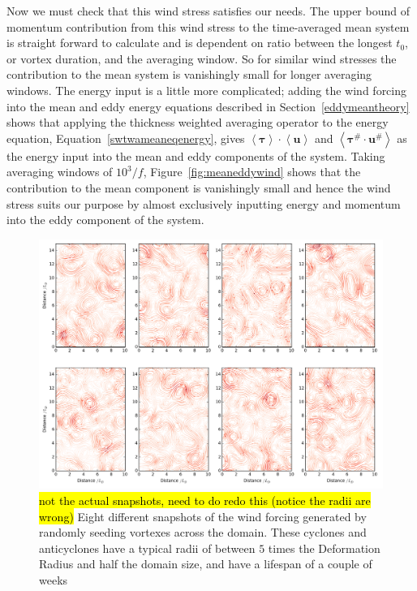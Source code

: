 \documentclass[12pt,a4paper]{report}
\newcommand*\nthkmean[1]{\left\langle{#1}\right\rangle}
\newcommand*\nthkres[1]{{#1}^{\#}}
\newcommand*\figref[1]{Figure~\ref{#1}}
\newcommand*\equref[1]{Equation~\eqref{#1}}
\newcommand*\secref[1]{Section~\ref{#1}}
\begin{document}
Now we must check that this wind stress satisfies our needs. 
The upper bound of momentum contribution from
this wind stress to the time-averaged mean system is straight forward to calculate
and is dependent on ratio between the longest $t_{0}$, or vortex duration, 
and the averaging window. So for similar wind stresses the contribution to the mean system
is vanishingly small for longer averaging windows. The energy input is a little more
complicated; adding the wind forcing into the mean and eddy energy equations described 
in \secref{eddymeantheory} 
shows that applying the thickness weighted averaging operator to 
the energy equation, \equref{swtwameaneqenergy}, gives
$\nthkmean{\boldsymbol{\tau}}\cdot\nthkmean{\boldsymbol{u}}$ and  $\nthkmean{\nthkres{\boldsymbol{\tau}}\cdot\nthkres{\boldsymbol{u}}}$
as the energy input into the mean and eddy components of the system.
Taking averaging windows of $10^{3}/f$, \figref{fig:meaneddywind} shows
that the contribution to the mean component is vanishingly small 
and hence the wind stress suits our purpose by almost exclusively 
inputting energy and momentum into the eddy component of the system.

\begin{figure}
	\centering
	\includegraphics[width=\linewidth]{StochWind}
	\caption{\hl{not the actual snapshots, need to do redo this (notice the radii are wrong)} Eight different snapshots of the wind forcing
		generated by randomly seeding vortexes
		across the domain.
		These cyclones and anticyclones have a typical radii of between $5$ times
		the Deformation Radius and half the domain size, and have a lifespan of a couple of weeks}
	\label{fig:StochWind}
\end{figure}
\end{document}
